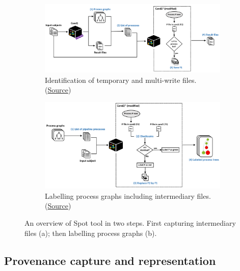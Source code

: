 \documentclass[a4paper,num-refs]{oup-contemporary}
\begin{document}
\begin{figure}
  \centering
  \begin{subfigure}{\columnwidth}
    \centering
    \includegraphics[width=1\columnwidth]{images/fig1-a}
    \caption{Identification of temporary and multi-write files.
    (\href{https://docs.google.com/drawings/d/1rsbFwPjNPNMRhXUl4RSK3G0OaiJC7K-buiHN0hPD8eQ/edit?usp=sharing}{Source})}
    \label{fig:overview-capturing}
  \end{subfigure}
   \begin{subfigure}{\columnwidth}
    \centering
     \includegraphics[width=1\columnwidth]{images/fig1-b}
     \caption{Labelling process graphs including intermediary files.
     (\href{https://docs.google.com/drawings/d/1yblYuKWAD18aJe5JxBu2h1EysyoQA3YrsQj-1T3s0l8/edit?usp=sharing}{Source})}
     \label{fig:overview-labelling}
   \end{subfigure}
   \caption{An overview of Spot tool in two steps. First capturing intermediary files (a); then
            labelling process graphs (b).}
   \label{fig:overview}
  \end{figure}

\subsection{Provenance capture and representation}
\end{document}
